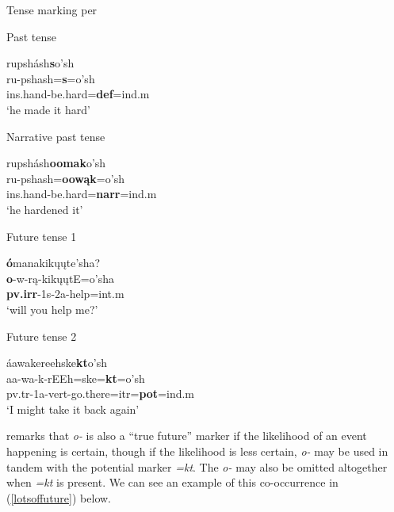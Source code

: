 \begin{exe}
\item\label{hollowtense} Tense marking per \citet{hollow1970}

	\begin{xlist}
	
	\item Past tense
	
	\glll rupshásh\textbf{s}o'sh\\
		ru-pshash=\textbf{s}=o'sh\\
		ins.hand-\textnormal{be.hard}=\textbf{def}=ind.m\\
	\glt	`he made it hard' \citep[479]{hollow1970}

	\item Narrative past tense
	
	\glll	rupshásh\textbf{oomak}o'sh\\
		ru-pshash=\textbf{oowąk}=o'sh\\
		ins.hand-\textnormal{be.hard}=\textbf{narr}=ind.m\\
	\glt	`he hardened it' \citep[475]{hollow1970}

	\item Future tense 1
	
	\glll	\textbf{ó}manakikųųte'sha?\\
		\textbf{o}-w-rą-kikųųtE=o'sha\\
		\textbf{pv.irr}-1s-2a-\textnormal{help}=int.m\\
	\glt	`will you help me?' \citep[456]{hollow1970}

	\item Future tense 2

	\glll áawakereehske\textbf{kt}o'sh\\
		aa-wa-k-rEEh=ske=\textbf{kt}=o'sh\\
		pv.tr-1a-vert-\textnormal{go.there}=itr=\textbf{pot}=ind.m\\
	\glt	`I might take it back again' \citep[480]{hollow1970}
	
	\end{xlist}

\end{exe}

\citet[455]{hollow1970} remarks that \textit{o-} is also a ``true future'' marker if the likelihood of an event happening is certain, though if the likelihood is less certain, \textit{o-} may be used in tandem with the potential marker \textit{=kt}. The \textit{o-} may also be omitted altogether when \textit{=kt} is present. We can see an example of this co-occurrence in (\ref{lotsoffuture}) below.

